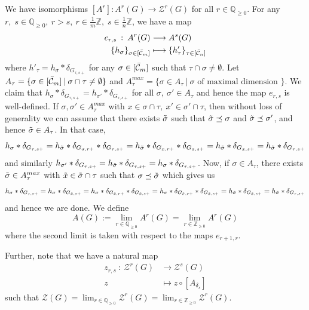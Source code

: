 \documentclass[11 pt]{article}
\numberwithin{equation}{subsection}
\theoremstyle{definition}
\theoremstyle{remark}
\theoremstyle{conjecture}
\newcommand{\Z}{\mathbb Z}
\newcommand{\Q}{\mathbb Q}
\newcommand{\ZZ}{\mathcal{Z}}
\newcommand{\mc}{\mathcal}
\newcommand{\mcC}{\mathcal C}
\begin{document}
We have isomorphisms $[A^r] : A^r(G) \longrightarrow \mc Z^r(G)$ for all $r\in \Q_{\geq 0}$. For any $r,\;s\in \Q_{\geq 0}, \:r>s,\: r\in \frac{1}{m}\Z,\; s\in \frac{1}{n}\Z$, we have a map 
\begin{align*}
            e_{r,s} \:: \:A^{r}(G) &\longrightarrow  A^s(G) \\
            \{ h_\sigma\}_{\sigma\in [\Bar{\mcC}_m]} &\longmapsto \{ h'_\tau\}_{\tau\in [\Bar{\mcC}_n]}
        \end{align*} 
    where $ h'_\tau= h_\sigma *\delta_{G_{\tau,s+}}$ for any $\sigma \in [\Bar{\mcC}_m]$ such that $\tau\cap \sigma \neq \emptyset$. Let $A_\tau=\{\sigma \in [\Bar{\mcC}_m] \:|\: \sigma \cap \tau \neq \emptyset\}$ and $A^{max}_\tau=\{\sigma \in A_\tau\:|\: \sigma \text{ of maximal dimension }  \}$. We claim that $h_\sigma *\delta_{G_{\tau,s+}}=h_{\sigma'} *\delta_{G_{\tau,s+}}$ for all $\sigma,\: \sigma'\in A_\tau$ and hence the map $e_{r,s}$ is well-defined. If $\sigma, \sigma'\in  A^{max}_\tau$ with $x\in \sigma \cap \tau,\: x' \in \sigma' \cap \tau $, then without loss of generality we can assume that there exists $\Tilde{\sigma}$ such that $\Tilde{\sigma} \preceq \sigma$ and $\Tilde{\sigma} \preceq \sigma'$, and hence $\Tilde{\sigma} \in A_\tau$. In that case,
    \[
    h_{\sigma}*\delta_{G_{\tau,s+}}=h_{\Tilde{\sigma}}*\delta_{G_{\sigma,r+}}*\delta_{G_{\tau,s+}}=h_{\Tilde{\sigma}}*\delta_{G_{x,r+}}*\delta_{G_{x,s+}}=h_{\Tilde{\sigma}}*\delta_{G_{x,s+}}=h_{\Tilde{\sigma}}*\delta_{G_{\tau,s+}}
    \]
and similarly $h_{\sigma'}*\delta_{G_{\tau,s+}}=h_{\Tilde{\sigma}}*\delta_{G_{\tau,s+}}=h_{\sigma}*\delta_{G_{\tau,s+}}$. Now, if $\sigma \in A_\tau$, there exists $\Tilde{\sigma} \in A^{max}_\tau$ with $\Tilde{x}\in \Tilde{\sigma}\cap \tau $ such that $\sigma \preceq \Tilde{\sigma}$ which gives us
\[
h_{\sigma}*\delta_{G_{\tau,s+}}=h_{\sigma}*\delta_{G_{\Tilde{x},s+}}=h_{\sigma}*\delta_{G_{\Tilde{x},r+}}*\delta_{G_{\Tilde{x},s+}}=h_{\sigma}*\delta_{G_{\Tilde{\sigma},r+}}*\delta_{G_{\Tilde{x},s+}}=h_{\Tilde{\sigma}}*\delta_{G_{\Tilde{x},s+}}=h_{\Tilde{\sigma}}*\delta_{G_{\tau,s+}}
\]
and hence we are done. We define
\begin{equation}
    A(G) := \lim_{r\in \Q_{\geq 0}}A^r(G) = \lim_{r\in \Z_{\geq 0}}A^r(G) 
\end{equation}
where the second limit is taken with respect to the maps $e_{r+1,r}$.\par
Further, note that we have a natural map 
\begin{align*}
            z_{r,s} \:: \:\ZZ^{r}(G) &\longrightarrow  \ZZ^s(G) \\
            z &\longmapsto z \circ [A_{\delta_s}]
        \end{align*} 
        such that $\ZZ(G) = \lim_{r\in \Q_{\geq 0}}\ZZ^r(G)=\lim_{r\in \Z_{\geq 0}}\ZZ^r(G)$. 
\end{document}
